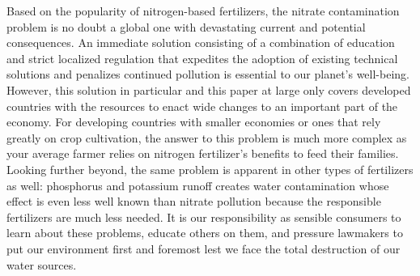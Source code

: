 \documentclass[12pt]{article}
\begin{document}
		Based on the popularity of nitrogen-based fertilizers, the nitrate contamination problem is no doubt a global one with devastating current and potential consequences. An immediate solution consisting of a combination of education and strict localized regulation that expedites the adoption of existing technical solutions and penalizes continued pollution is essential to our planet's well-being. However, this solution in particular and this paper at large only covers developed countries with the resources to enact wide changes to an important part of the economy. For developing countries with smaller economies or ones that rely greatly on crop cultivation, the answer to this problem is much more complex as your average farmer relies on nitrogen fertilizer's benefits to feed their families. Looking further beyond, the same problem is apparent in other types of fertilizers as well: phosphorus and potassium runoff creates water contamination whose effect is even less well known than nitrate pollution because the responsible fertilizers are much less needed. It is our responsibility as sensible consumers to learn about these problems, educate others on them, and pressure lawmakers to put our environment first and foremost lest we face the total destruction of our water sources. 
\pagebreak	
\end{document}
